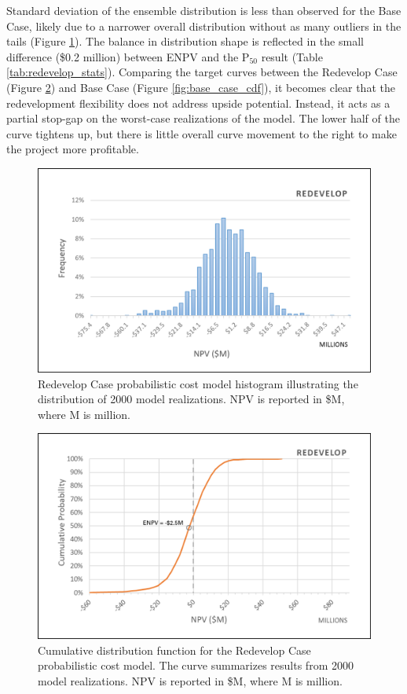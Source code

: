 Standard deviation of the ensemble distribution is less than observed for the Base Case, likely due to a narrower overall distribution without as many outliers in the tails (Figure \ref{fig:redevelop_case_hist}). The balance in distribution shape is reflected in the small difference (\$0.2 million) between ENPV and the P$_{50}$ result (Table \ref{tab:redevelop_stats}). Comparing the target curves between the Redevelop Case (Figure \ref{fig:redevelop_case_cdf}) and Base Case (Figure \ref{fig:base_case_cdf}), it becomes clear that the redevelopment flexibility does not address upside potential. Instead, it acts as a partial stop-gap on the worst-case realizations of the model. The lower half of the curve tightens up, but there is little overall curve movement to the right to make the project more profitable.

\begin{figure}
\centering
\includegraphics[width=.8\textwidth]{templates/images/Figure-Redevelop_Case_Histogram.png}
\caption[Redevelop Case histogram]{Redevelop Case probabilistic cost model histogram illustrating the distribution of 2000 model realizations. NPV is reported in \$M, where M is million.}
\label{fig:redevelop_case_hist}
\end{figure}

\begin{figure}
\centering
\includegraphics[width=.8\textwidth]{templates/images/Figure-Redevelop_Case_CDF.png}
\caption[Redevelop Case CDF]{Cumulative distribution function for the Redevelop Case probabilistic cost model. The curve summarizes results from 2000 model realizations. NPV is reported in \$M, where M is million.}
\label{fig:redevelop_case_cdf}
\end{figure}

